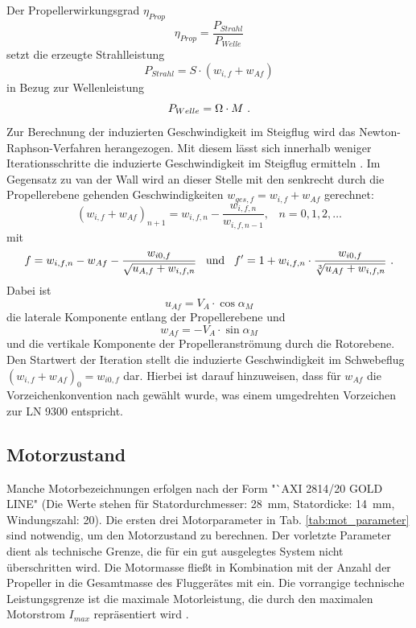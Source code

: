 Der Propellerwirkungsgrad \ensuremath{\eta_{Prop}} 
\begin{equation}
	\eta_{Prop} = \frac{P_{Strahl}}{P_{Welle}}
	\label{eq:eta_prop}
\end{equation}
setzt die erzeugte Strahlleistung 
\begin{equation}
	P_{Strahl} = S\cdot (w_{i,f}+ w_{Af})
	\label{eq:strahlleistung}
\end{equation}
in Bezug zur Wellenleistung
\begin{equation}
	P_{Welle} = \Omega \cdot M ~\text{.}
\end{equation} 
Zur Berechnung der induzierten Geschwindigkeit im Steigflug wird das Newton-Raphson-Verfahren herangezogen. Mit diesem lässt sich innerhalb weniger Iterationsschritte die induzierte Geschwindigkeit im Steigflug ermitteln \cite[S.153]{Wall.2015}. Im Gegensatz zu van der Wall wird an dieser Stelle mit den senkrecht durch die Propellerebene gehenden Geschwindigkeiten \ensuremath{w_{ges,f} = w_{i,f} + w_{Af}} gerechnet:
\begin{equation}
	(w_{i,f} + w_{Af})_{n+1} = w_{i,f,n} - \frac{w_{i,f,n}}{w_{i,f,n-1}}, \;\;\; n = 0,1,2,\dots
\end{equation}
mit 
\begin{equation}
	f = w_{i,f,n} - w_{Af} - \frac{w_{i0,f}}{\sqrt{u_{A,f}+w_{i,f,n}}} \;\;\; \text{und} \;\;\; f'=1 + w_{i,f,n}\cdot\frac{w_{i0,f}}{\sqrt[3]{u_{Af}+w_{i,f,n}}} ~\text{.}
\end{equation}
Dabei ist 
\begin{equation}
	u_{Af} = V_{A}\cdot\cos\alpha_{M}
\end{equation}
die laterale Komponente entlang der Propellerebene und 
\begin{equation}
	w_{Af} = - V_{A}\cdot\sin\alpha_{M}
\end{equation}
und die vertikale Komponente der Propelleranströmung durch die Rotorebene. Den Startwert der Iteration stellt die induzierte Geschwindigkeit im Schwebeflug \ensuremath{(w_{i,f}+w_{Af})_{0} = w_{i0,f}} dar. Hierbei ist darauf hinzuweisen, dass für \ensuremath{w_{Af}} die Vorzeichenkonvention nach \cite{Wall.2015} gewählt wurde, was einem umgedrehten Vorzeichen zur LN 9300 entspricht. 


\subsection{Motorzustand}
\label{subsec:motorzustand}
Manche Motorbezeichnungen erfolgen nach der Form "`AXI 2814/20 GOLD LINE"\; (Die Werte stehen für Statordurchmesser: \SI{28}{mm}, Statordicke: \SI{14}{mm}, Windungszahl: 20). 
Die ersten drei Motorparameter in Tab. \ref{tab:mot_parameter} sind notwendig, um den Motorzustand zu berechnen. Der vorletzte Parameter dient als technische Grenze, die für ein gut ausgelegtes System nicht überschritten wird. Die Motormasse fließt in Kombination mit der Anzahl der Propeller in die Gesamtmasse des Fluggerätes mit ein. Die vorrangige technische Leistungsgrenze ist die maximale Motorleistung, die durch den maximalen Motorstrom \ensuremath{I_{max}} repräsentiert wird \cite{axi}. 

